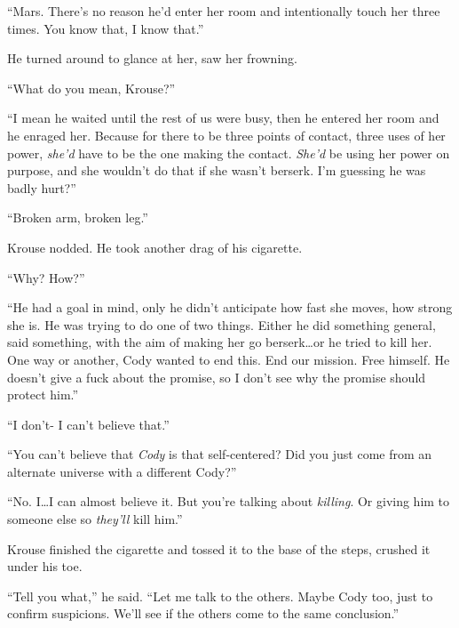 ``Mars.  There's no reason he'd enter her room and intentionally touch her three times.  You know that, I know that.''



He turned around to glance at her, saw her frowning.



``What do you mean, Krouse?''



``I mean he waited until the rest of us were busy, then he entered her room and he enraged her.  Because for there to be three points of contact, three uses of her power, \emph{she'd} have to be the one making the contact.  \emph{She'd} be using her power on purpose, and she wouldn't do that if she wasn't berserk.  I'm guessing he was badly hurt?''



``Broken arm, broken leg.''



Krouse nodded.  He took another drag of his cigarette.



``Why?  How?''



``He had a goal in mind, only he didn't anticipate how fast she moves, how strong she is.  He was trying to do one of two things.  Either he did something general, said something, with the aim of making her go berserk\ldots or he tried to kill her.  One way or another, Cody wanted to end this.  End our mission.  Free himself.  He doesn't give a fuck about the promise, so I don't see why the promise should protect him.''



``I don't- I can't believe that.''



``You can't believe that \emph{Cody} is that self-centered?  Did you just come from an alternate universe with a different Cody?''



``No.  I\ldots I can almost believe it.  But you're talking about \emph{killing}.  Or giving him to someone else so \emph{they'll} kill him.''



Krouse finished the cigarette and tossed it to the base of the steps, crushed it under his toe.



``Tell you what,'' he said.  ``Let me talk to the others.  Maybe Cody too, just to confirm suspicions.  We'll see if the others come to the same conclusion.''



